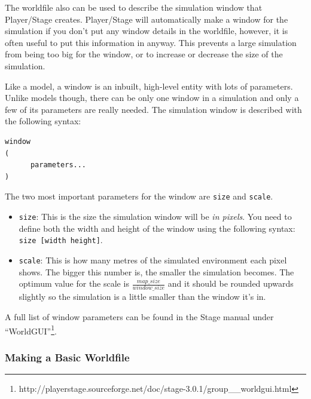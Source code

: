 \documentclass[a4paper]{article}
\newcommand{\plst}{Player/Stage\xspace}
\begin{document}
The worldfile also can be used to describe the simulation window that \plst creates. \plst will automatically make a window for the simulation if you don't put any window details in the worldfile, however, it is often useful to put this information in anyway. This prevents a large simulation from being too big for the window, or to increase or decrease the size of the simulation.

Like a model, a window is an inbuilt, high-level entity with lots of parameters. Unlike models though, there can be only one window in a simulation and only a few of its parameters are really needed. The simulation window is described with the following syntax:
\begin{verbatim}
window
(
      parameters...
)
\end{verbatim}

The two most important parameters for the window are \verb|size| and \verb|scale|.
\begin{itemize}
\item \verb|size|: This is the size the simulation window will be \emph{in pixels}. You need to define both the width and height of the window using the following syntax: \verb|size [width height]|. 
\item \verb|scale|: This is how many metres of the simulated environment each pixel shows. The bigger this number is, the smaller the simulation becomes. The optimum value for the scale is $\frac{map\_size}{window\_size}$ and it should be rounded upwards slightly so the simulation is a little smaller than the window it's in. 
\end{itemize}

A full list of window parameters can be found in the Stage manual under ``WorldGUI''\footnote{http://playerstage.sourceforge.net/doc/stage-3.0.1/group\_\_worldgui.html}.

\subsubsection{Making a Basic Worldfile}\label{sec:basicWorldfile}
\end{document}
